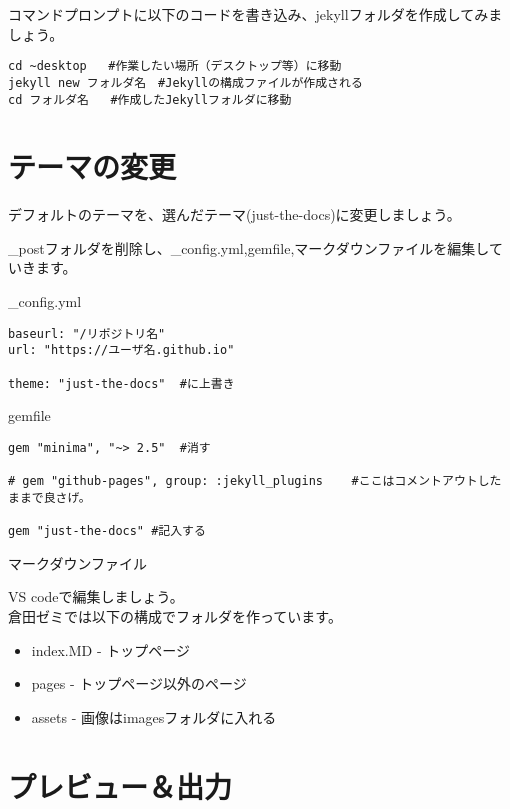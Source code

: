 \documentclass[
]{book}
\providecommand{\tightlist}{%
  \setlength{\itemsep}{0pt}\setlength{\parskip}{0pt}}
\begin{document}
コマンドプロンプトに以下のコードを書き込み、jekyllフォルダを作成してみましょう。

\begin{verbatim}
cd ~desktop   #作業したい場所（デスクトップ等）に移動
jekyll new フォルダ名　#Jekyllの構成ファイルが作成される
cd フォルダ名   #作成したJekyllフォルダに移動
\end{verbatim}

\hypertarget{ux30c6ux30fcux30deux306eux5909ux66f4}{%
\section{テーマの変更}\label{ux30c6ux30fcux30deux306eux5909ux66f4}}

デフォルトのテーマを、選んだテーマ(just-the-docs)に変更しましょう。

\_postフォルダを削除し、\_config.yml,gemfile,マークダウンファイルを編集していきます。

\_config.yml

\begin{verbatim}
baseurl: "/リポジトリ名" 
url: "https://ユーザ名.github.io" 

theme: "just-the-docs"  #に上書き
\end{verbatim}

gemfile

\begin{verbatim}
gem "minima", "~> 2.5"  #消す

# gem "github-pages", group: :jekyll_plugins    #ここはコメントアウトしたままで良さげ。

gem "just-the-docs" #記入する
\end{verbatim}

マークダウンファイル

VS codeで編集しましょう。\\
倉田ゼミでは以下の構成でフォルダを作っています。

\begin{itemize}
\tightlist
\item
  index.MD - トップページ
\item
  pages - トップページ以外のページ
\item
  assets - 画像はimagesフォルダに入れる
\end{itemize}

\hypertarget{ux30d7ux30ecux30d3ux30e5ux30fcux51faux529b}{%
\section{プレビュー＆出力}\label{ux30d7ux30ecux30d3ux30e5ux30fcux51faux529b}}
\end{document}
